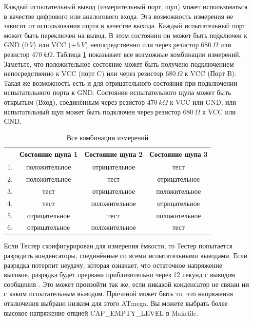Каждый испытательный вывод (измерительный порт, щуп) может использоваться в качестве цифрового или аналогового 
входа. Эта возможность измерения не зависит от использования порта в качестве выхода. Каждый испытательный порт 
может быть переключен на вывод. В этом состоянии он может быть подключен к GND (\(0~V\)) или VCC (\(+5~V\)) 
непосредственно или через резистор \(680~\Omega\) или резистор \(470~k\Omega\).
Таблица \ref{tab:case} показывает все возможные комбинации измерений. Заметьте, что положительное состояние может 
быть получено подключением непосредственно к VCC (порт C) или через резистор \(680~\Omega\) к VCC (Порт B). Такая 
же возможность есть и для отрицательного состояния при подключении испытательного порта к GND. Состояние 
испытательного щупа может быть открытым (Вход), соединённым через резистор \(470~k\Omega\) к VCC или GND, 
или испытательный щуп может быть подключен через резистор \(680~\Omega\) к VCC или GND.

\begin{table}[H]
  \begin{center}
    \begin{tabular}{| l | c | c | c |}
    \hline
      & Состояние щупа 1 & Состояние щупа 2 & Состояние щупа 3 \\
    \hline
   1. & положительное    &  отрицательное    &  тест \\
   2. & положительное    &  тест       & отрицательное \\
   3. & тест        &  отрицательное    & положительное \\
   4. & тест        &  положительное    & отрицательное \\
   5. & отрицательное     &  тест       & положительное \\
   6. & отрицательное     &  положительное    &  тест  \\
    \hline
    \end{tabular}
  \end{center}
  \caption{Все комбинации измерений}
  \label{tab:case} 
\end{table}

Если Тестер сконфигурирован для измерения ёмкости, то Тестер попытается разрядить конденсаторы, 
соединённые со всеми испытательными выводами. Если разрядка потерпит неудачу, которая означает,
что остаточное напряжение высокое, разрядка будет прервана приблизительно через 12 секунд
с выводом сообщения . Это может произойти так же, если никакой конденсатор не связан ни с каким 
испытательным выводом. 
Причиной может быть то, что напряжения отключения выбрано низким для этого ATmega. Вы можете выбрать более 
высокое напряжение опцией CAP\_EMPTY\_LEVEL в Makefile.
